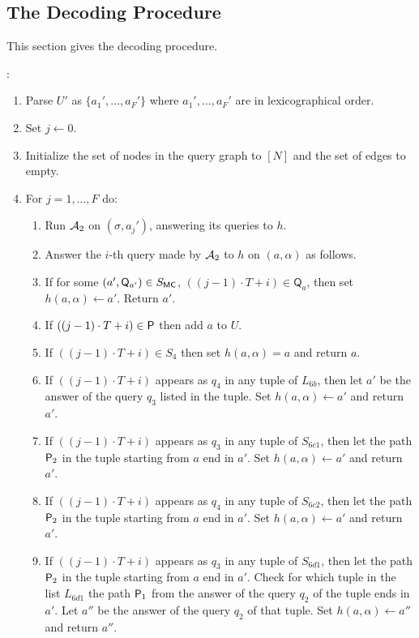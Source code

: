 \subsection{The Decoding Procedure}
This section gives the decoding procedure. 

\medskip {}:
\begin{enumerate}
  \item Parse $U'$ as $\{a_1',\ldots,a_F'\}$ where $a_1',\ldots,a_F'$ are in lexicographical order.
  \item Set $j\gets 0$.
  \item Initialize the set of nodes in the query graph to $[N]$ and the set of edges to empty. 
  \item For $j=1,\ldots,F$ do:
  \begin{enumerate}[label=(\roman*)]
  \item Run $\mathcal{A}_2$ on $(\sigma,a_j')$, answering its queries to $h$. 
  \item Answer the $i$-th query made by $\mathcal{A}_2$ to $h$ on $(a,\alpha)$ as follows.
  \item If for some $(a',\mathsf{Q}_{a'})\in S_\mathsf{{MC}}$, $((j-1)\cdot T+i)\in \mathsf{Q}_a$, then set $h(a,\alpha)\gets a'$. Return $a'$.
  \item If $((j-1)\cdot T+i)\in \mathsf{P}$ then add $a$ to $U$. 
  \item If $((j-1)\cdot T+i)\in S_4$ then set $h(a,\alpha)=a$ and return $a$.
  \item If $((j-1)\cdot T+i)$ appears as $q_4$ in any tuple of $L_{6b}$, then let $a'$ be the answer of the query $q_3$ listed in the tuple. Set $h(a,\alpha)\gets a'$ and return $a'$.
  \item If $((j-1)\cdot T+i)$ appears as $q_3$ in any tuple of $S_{6c1}$, then let the path $\mathsf{P}_2$ in the tuple starting from $a$ end in $a'$. Set $h(a,\alpha)\gets a'$ and return $a'$.
  \item If $((j-1)\cdot T+i)$ appears as $q_4$ in any tuple of $S_{6c2}$, then let the path $\mathsf{P}_2$ in the tuple starting from $a$ end in $a'$. Set $h(a,\alpha)\gets a'$ and return $a'$.
  \item If $((j-1)\cdot T+i)$ appears as $q_3$ in any tuple of $S_{6d1}$, then let the path $\mathsf{P}_2$ in the tuple starting from $a$ end in $a'$. Check for which tuple in the list $L_{6d1}$ the path $\mathsf{P}_1$ from the answer of the query $q_2$ of the tuple ends in $a'$. Let $a''$ be the answer of the query $q_2$ of that tuple. Set $h(a,\alpha)\gets a''$ and return $a''$.

\end{enumerate}
\end{enumerate}
